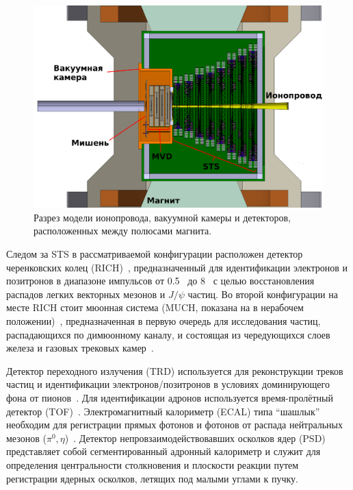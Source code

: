 \begin{figure}[H]
\includegraphics[width=1.0\textwidth]{pictures/CBM_vacuum_chamber_model.png}
\caption{Разрез модели ионопровода, вакуумной камеры и детекторов, расположенных между полюсами магнита.}
\label{fig:InMagnetBox}
\end{figure}

Следом за STS в рассматриваемой конфигурации расположен детектор черенковских колец (RICH)~\cite{TDR_RICH}, предназначенный для идентификации электронов и позитронов в диапазоне импульсов от 0.5~\GeVoverC{} до 8~\GeVoverC{} с целью восстановления распадов легких векторных мезонов и $ J / \psi $ частиц. Во второй конфигурации на месте RICH стоит мюонная система (MUCH, показана на  в нерабочем положении)~\cite{TDR_MUCH}, предназначенная в первую очередь для исследования частиц, распадающихся по димюонному каналу, и состоящая из чередующихся слоев железа и газовых трековых камер~\cite{GEM}.

Детектор переходного излучения (TRD) используется для реконструкции треков частиц и идентификации электронов/позитронов в условиях доминирующего фона от пионов~\cite{TRD}. Для идентификации адронов используется время-пролётный детектор (TOF)~\cite{TDR_TOF}. Электромагнитный калориметр (ECAL) типа ``шашлык'' необходим для регистрации прямых фотонов и фотонов от распада нейтральных мезонов ($ \pi^{0}, \eta $)~\cite{ECAL_KOROLKO}. Детектор непровзаимодействовавших осколков ядер (PSD)~\cite{TDR_PSD} представляет собой сегментированный адронный калориметр и служит для определения центральности столкновения и плоскости реакции путем регистрации ядерных осколков, летящих под малыми углами к пучку.

